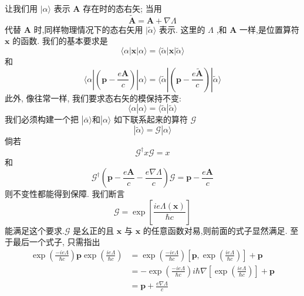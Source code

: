 让我们用 $|\alpha \rangle$ 表示 $\mathbf{A}$ 存在时的态右矢; 当用
\begin{equation}
\widetilde{\mathbf{A}} = \mathbf{A} + \nabla \Lambda
\end{equation}
代替 $\mathbf{A}$ 时,同样物理情况下的态右矢用 $|\widetilde{\alpha }\rangle$ 表示. 这里的 $\Lambda$ ,和 $\mathbf{A}$ 一样,是位置算符 $\mathbf{x}$ 的函数. 我们的基本要求是
\begin{equation}
\langle \alpha \left| \mathbf{x}\right| \alpha \rangle = \langle \widetilde{\alpha }\left| \mathbf{x}\right| \widetilde{\alpha }\rangle
\end{equation}
和
\begin{equation}
\langle \alpha | \left( {\mathbf{p} - \frac{e\mathbf{A}}{c}}\right) | \alpha \rangle = \langle \widetilde{\alpha }| \left( {\mathbf{p} - \frac{e\widetilde{\mathbf{A}}}{c}}\right) | \widetilde{\alpha }\rangle
\end{equation}
此外, 像往常一样, 我们要求态右矢的模保持不变:
\begin{equation}
\langle \alpha | \alpha \rangle = \langle \widetilde{\alpha } | \widetilde{\alpha }\rangle
\end{equation}
我们必须构建一个把 $\left| {\bar{\alpha }\rangle \text{和}}\right| \alpha \rangle$ 如下联系起来的算符 $\mathscr{G}$
\begin{equation}
\left| {\widetilde{\alpha }\rangle = \mathscr{G}}\right| \alpha \rangle
\end{equation}
倘若
\begin{equation}
\mathscr{G}^\dagger x\mathscr{G}= x
\end{equation}
和
\begin{equation}
\mathscr{G}^\dagger\left( {\mathbf{p} - \frac{e\mathbf{A}}{c} - \frac{e\nabla \Lambda }{c}}\right) \mathscr{G} = \mathbf{p} - \frac{e\mathbf{A}}{c}
\end{equation}
则不变性都能得到保障. 我们断言
\begin{equation}
\mathscr{G} = \exp \left\lbrack \frac{{ie\Lambda }\left( \mathbf{x}\right) }{\hbar c}\right\rbrack
\end{equation}
能满足这个要求.$\mathscr{G}$ 是幺正的且 $\mathbf{x}$ 与 $\mathbf{x}$ 的任意函数对易,则前面的式子显然满足. 至于最后一个式子, 只需指出
\begin{equation}
\begin{aligned}
	\exp \left( \frac{-{ie\Lambda }}{\hbar c}\right) \mathbf{p}\exp \left( \frac{ie\Lambda }{\hbar c}\right) &= \exp \left( \frac{-{ie\Lambda }}{\hbar c}\right) \left\lbrack {\mathbf{p},\exp \left( \frac{ie\Lambda }{\hbar c}\right) }\right\rbrack + \mathbf{p}\\
	&= - \exp \left( \frac{-{ie\Lambda }}{\hbar c}\right) i\hbar \nabla \left\lbrack {\exp \left( \frac{ie\Lambda }{\hbar c}\right) }\right\rbrack + \mathbf{p}\\
	&= \mathbf{p} + \frac{e\nabla \Lambda }{c}
\end{aligned}
\end{equation}
